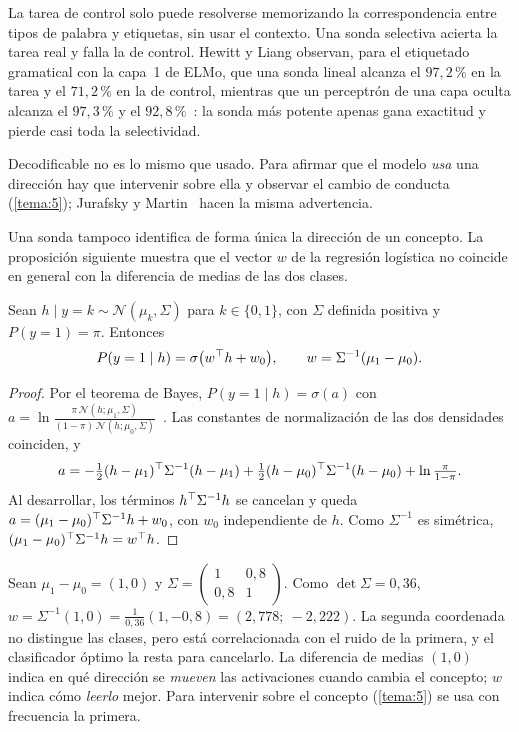 La tarea de control solo puede resolverse memorizando la correspondencia entre tipos de palabra y etiquetas, sin usar el contexto. Una sonda selectiva acierta la tarea real y falla la de control. Hewitt y Liang observan, para el etiquetado gramatical con la capa~1 de ELMo, que una sonda lineal alcanza el $97{,}2\,\%$ en la tarea y el $71{,}2\,\%$ en la de control, mientras que un perceptrón de una capa oculta alcanza el $97{,}3\,\%$ y el $92{,}8\,\%$~\cite[§3.5]{hewitt-liang}: la sonda más potente apenas gana exactitud y pierde casi toda la selectividad.

\begin{observacion}\label{obs:usado}
Decodificable no es lo mismo que usado. Para afirmar que el modelo \emph{usa} una dirección hay que intervenir sobre ella y observar el cambio de conducta (\cref{tema:5}); Jurafsky y Martin~\cite[§10.2]{jm3} hacen la misma advertencia.
\end{observacion}

Una sonda tampoco identifica de forma única la dirección de un concepto. La proposición siguiente muestra que el vector $w$ de la regresión logística no coincide en general con la diferencia de medias de las dos clases.

\begin{proposicion}\label{prop:lda}
Sean $h\mid y=k\sim\mathcal{N}(\mu_k,\Sigma)$ para $k\in\{0,1\}$, con $\Sigma$ definida positiva y $P(y=1)=\pi$. Entonces
\[
P(y=1\mid h)=\sigma\bigl(w^{\top} h+w_0\bigr),\qquad w=\Sigma^{-1}(\mu_1-\mu_0).
\]
\end{proposicion}

\begin{proof}
Por el teorema de Bayes, $P(y=1\mid h)=\sigma(a)$ con $a=\ln\frac{\pi\,\mathcal{N}(h;\mu_1,\Sigma)}{(1-\pi)\,\mathcal{N}(h;\mu_0,\Sigma)}$~\cite[§4.2]{bishop}. Las constantes de normalización de las dos densidades coinciden, y
\[
a=-\tfrac12(h-\mu_1)^{\top}\Sigma^{-1}(h-\mu_1)+\tfrac12(h-\mu_0)^{\top}\Sigma^{-1}(h-\mu_0)+\ln\tfrac{\pi}{1-\pi}.
\]
Al desarrollar, los términos $h^{\top}\Sigma^{-1}h$ se cancelan y queda $a=(\mu_1-\mu_0)^{\top}\Sigma^{-1}h+w_0$, con $w_0$ independiente de $h$. Como $\Sigma^{-1}$ es simétrica, $(\mu_1-\mu_0)^{\top}\Sigma^{-1}h=w^{\top} h$.
\end{proof}

\begin{ejemplo}\label{ej:lda}
Sean $\mu_1-\mu_0=(1,0)$ y $\Sigma=\begin{pmatrix}1&0{,}8\\0{,}8&1\end{pmatrix}$. Como $\det\Sigma=0{,}36$, $w=\Sigma^{-1}(1,0)=\frac{1}{0{,}36}(1,-0{,}8)=(2{,}778;\allowbreak\ -2{,}222)$. La segunda coordenada no distingue las clases, pero está correlacionada con el ruido de la primera, y el clasificador óptimo la resta para cancelarlo. La diferencia de medias $(1,0)$ indica en qué dirección se \emph{mueven} las activaciones cuando cambia el concepto; $w$ indica cómo \emph{leerlo} mejor. Para intervenir sobre el concepto (\cref{tema:5}) se usa con frecuencia la primera.
\end{ejemplo}

